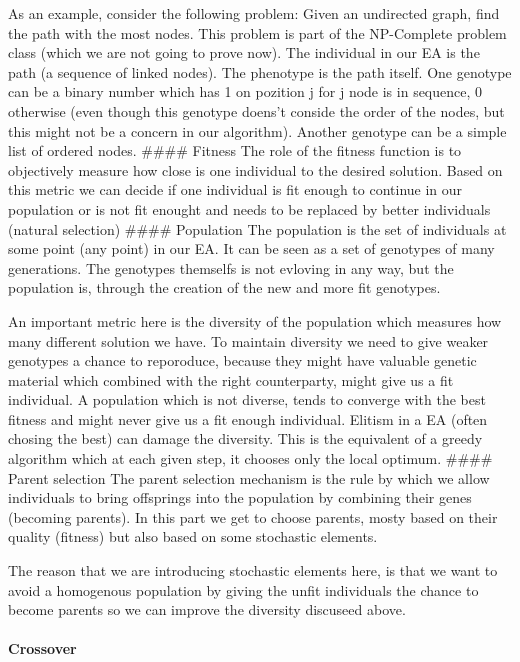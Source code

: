 \documentclass[11pt]{article}
\begin{document}
As an example, consider the following problem: Given an undirected
graph, find the path with the most nodes. This problem is part of the
NP-Complete problem class (which we are not going to prove now). The
individual in our EA is the path (a sequence of linked nodes). The
phenotype is the path itself. One genotype can be a binary number which
has 1 on pozition j for j node is in sequence, 0 otherwise (even though
this genotype doens't conside the order of the nodes, but this might not
be a concern in our algorithm). Another genotype can be a simple list of
ordered nodes. \#\#\#\# Fitness The role of the fitness function is to
objectively measure how close is one individual to the desired solution.
Based on this metric we can decide if one individual is fit enough to
continue in our population or is not fit enought and needs to be
replaced by better individuals (natural selection) \#\#\#\# Population
The population is the set of individuals at some point (any point) in
our EA. It can be seen as a set of genotypes of many generations. The
genotypes themselfs is not evloving in any way, but the population is,
through the creation of the new and more fit genotypes.

An important metric here is the diversity of the population which
measures how many different solution we have. To maintain diversity we
need to give weaker genotypes a chance to reporoduce, because they might
have valuable genetic material which combined with the right
counterparty, might give us a fit individual. A population which is not
diverse, tends to converge with the best fitness and might never give us
a fit enough individual. Elitism in a EA (often chosing the best) can
damage the diversity. This is the equivalent of a greedy algorithm which
at each given step, it chooses only the local optimum. \#\#\#\# Parent
selection The parent selection mechanism is the rule by which we allow
individuals to bring offsprings into the population by combining their
genes (becoming parents). In this part we get to choose parents, mosty
based on their quality (fitness) but also based on some stochastic
elements.

The reason that we are introducing stochastic elements here, is that we
want to avoid a homogenous population by giving the unfit individuals
the chance to become parents so we can improve the diversity discuseed
above.

\hypertarget{crossover}{%
\paragraph{Crossover}\label{crossover}}
\end{document}
